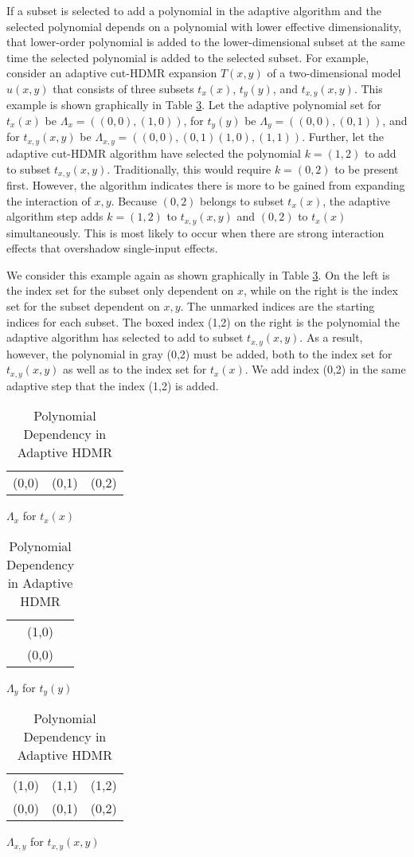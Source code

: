 If a subset is
selected to add a polynomial in the adaptive algorithm and the selected polynomial depends on a polynomial with 
lower effective
dimensionality, that lower-order polynomial is added to the lower-dimensional subset at the same time the
selected polynomial is added to the selected subset.  For example, consider an adaptive cut-HDMR expansion $T(x,y)$ of a
two-dimensional model $u(x,y)$ that consists of three subsets $t_x(x)$, $t_y(y)$, and $t_{x,y}(x,y)$.  This example
is shown graphically in Table \ref{tab:poly uniq}.  Let the adaptive
polynomial set for $t_x(x)$ be $\Lambda_x = ( (0,0),(1,0) )$, for $t_y(y)$ be $\Lambda_y = ( (0,0),(0,1) )$, and for
$t_{x,y}(x,y)$ be $\Lambda_{x,y} =( (0,0),(0,1)(1,0),(1,1))$.  Further, let the adaptive cut-HDMR algorithm have
selected the polynomial $k=(1,2)$ to add to subset $t_{x,y}(x,y)$.  Traditionally, this would require $k=(0,2)$ to
be present first.  However, the algorithm indicates there is more to be gained from expanding the interaction
of $x,y$.  Because $(0,2)$ belongs to subset $t_x(x)$, the adaptive algorithm step adds $k=(1,2)$
to $t_{x,y}(x,y)$ and $(0,2)$ to $t_x(x)$ simultaneously.  This is most likely to occur when there are strong
interaction effects that overshadow single-input effects.

We consider this example again as shown graphically in Table \ref{tab:poly uniq}.  
On the left is the index set for the subset
only dependent on $x$, while on the right is the index set for the subset dependent on $x,y$.  The unmarked
indices are the starting indices for each subset.  The boxed index (1,2) on the right is the polynomial the
adaptive algorithm has selected to add to subset $t_{x,y}(x,y)$.  As a result, however, the polynomial in gray
(0,2) must be added, both to the index set for $t_{x,y}(x,y)$ as well as to the index set for $t_x(x)$.  We
add index (0,2) in the same adaptive step that the index (1,2) is added.
\begin{table}
  \parbox{.30\linewidth}{
    \centering
    \begin{tabular}{c c c}
      (0,0) & (0,1) & \cellcolor{Gray6}(0,2)
    \end{tabular}
    \caption{$\Lambda_x$ for $t_x(x)$}
  }
  \hfill
  \parbox{.30\linewidth}{
    \centering
    \begin{tabular}{c}
      (1,0) \\
      (0,0)
    \end{tabular}
    \caption{$\Lambda_y$ for $t_y(y)$}
  }
  \hfill
  \parbox{.30\linewidth}{
    \centering
    \begin{tabular}{c c c}
      \cline{3-3} (1,0) & (1,1) & \multicolumn{1}{|c|}{(1,2)} \\
      \cline{3-3} (0,0) & (0,1) & \cellcolor{Gray6}(0,2)
    \end{tabular}
    \caption{$\Lambda_{x,y}$ for $t_{x,y}(x,y)$}
  }
  \caption{Polynomial Dependency in Adaptive HDMR}
  \label{tab:poly uniq}
\end{table}

